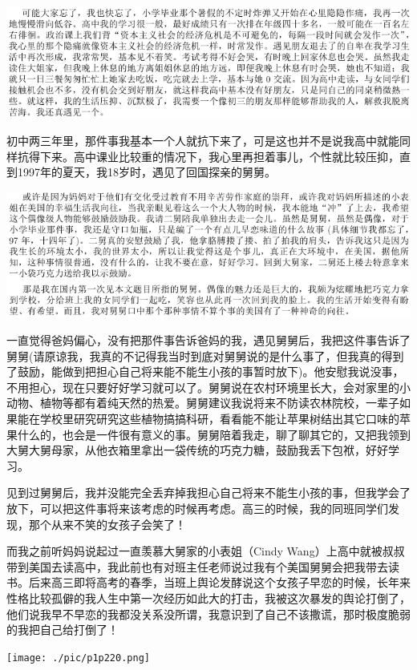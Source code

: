 \documentclass[9pt, b5paper]{article}
\begin{document}
\includegraphics[width=.9\linewidth]{./pic/p1p21-0.png}

初中两三年里，那件事我基本一个人就抗下来了，可是这也并不是说我高中就能同样抗得下来。高中课业比较重的情况下，我心里再担着事儿，个性就比较压抑，直到1997年的夏天，我18岁时，遇见了回国探亲的舅舅。

\includegraphics[width=.9\linewidth]{./pic/p1p21.png}

一直觉得爸妈偏心，没有把那件事告诉爸妈的我，遇见舅舅后，我把这件事告诉了舅舅(请原谅我，我真的不记得我当时到底对舅舅说的是什么事了，但我真的得到了鼓励，能做到把担心自己将来能不能生小孩的事暂时放下)。他安慰我说没事，不用担心，现在只要好好学习就可以了。舅舅说在农村环境里长大，会对家里的小动物、植物等都有着纯天然的热爱。舅舅建议我说将来不防读农林院校，一辈子如果能在学校里研究研究这些植物搞搞科研，看看能不能让苹果树结出其它口味的苹果什么的，也会是一件很有意义的事。舅舅陪着我走，聊了聊其它的，又把我领到大舅大舅母家，从他衣箱里拿出一袋传统的巧克力糖，鼓励我丢下包袱，好好学习。

见到过舅舅后，我并没能完全丢弃掉我担心自己将来不能生小孩的事，但我学会了放下，可以把这件事将来该考虑的时候再考虑。高三的时候，我的同班同学们发现，那个从来不笑的女孩子会笑了！

而我之前听妈妈说起过一直羡慕大舅家的小表姐（Cindy Wang）上高中就被叔叔带到美国去读高中，我此前也有对班主任老师说过我有个美国舅舅会把我带去读书。后来高三即将高考的春季，当班上舆论发酵说这个女孩子早恋的时候，长年来性格比较孤僻的我人生中第一次经历如此大的打击，我被这次暴发的舆论打倒了，他们说我早不早恋的我都没关系没所谓，我意识到了自己不该撒谎，那时极度脆弱的我把自己给打倒了！

\texttt{[image: ./pic/p1p220.png]}
\end{document}
